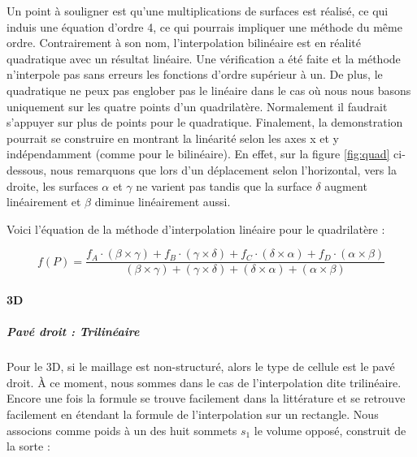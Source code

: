 Un point à souligner est qu'une multiplications de surfaces est réalisé, ce qui induis une équation d'ordre 4, ce qui pourrais impliquer une méthode du même ordre.
Contrairement à son nom, l'interpolation bilinéaire est en réalité quadratique avec un résultat linéaire.
Une vérification a été faite et la méthode n'interpole pas sans erreurs les fonctions d'ordre supérieur à un.
De plus, le quadratique ne peux pas englober pas le linéaire dans le cas où nous nous basons uniquement sur les quatre points d'un quadrilatère.
Normalement il faudrait s'appuyer sur plus de points pour le quadratique. 
Finalement, la demonstration pourrait se construire en montrant la linéarité selon les axes x et y indépendamment (comme pour le bilinéaire). En effet, sur la figure \ref{fig:quad} ci-dessous, nous remarquons que lors d'un déplacement selon l'horizontal, vers la droite, les surfaces \(\alpha\) et \(\gamma\) ne varient pas tandis que la surface \(\delta\) augment linéairement et \(\beta\) diminue linéairement aussi.

Voici l'équation de la méthode d'interpolation linéaire pour le quadrilatère :

\begin{equation}
    f(P) = \frac{f_{A} \cdot (\beta \times \gamma) + f_{B} \cdot (\gamma \times \delta) + f_{C} \cdot (\delta \times \alpha) + f_{D} \cdot (\alpha \times \beta)}{(\beta \times \gamma) + (\gamma \times \delta) + (\delta \times \alpha) + (\alpha \times \beta)}
\end{equation}
    

\vspace{0.5cm}  %


\paragraph{3D}
\subparagraph{Pavé droit : Trilinéaire}

Pour le 3D, si le maillage est non-structuré, alors le type de cellule est le pavé droit. À ce moment, nous sommes dans le cas de l'interpolation dite trilinéaire. Encore une fois la formule se trouve facilement dans la littérature et se retrouve facilement en étendant la formule de l'interpolation sur un rectangle. Nous associons comme poids à un des huit sommets \( s_1 \) le volume opposé, construit de la sorte :

